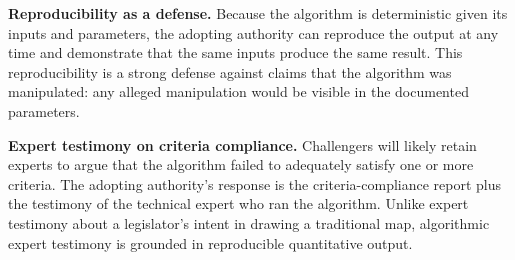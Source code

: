 \textbf{Reproducibility as a defense.}  Because the algorithm is deterministic
given its inputs and parameters, the adopting authority can reproduce the
output at any time and demonstrate that the same inputs produce the same
result.  This reproducibility is a strong defense against claims that the
algorithm was manipulated: any alleged manipulation would be visible in
the documented parameters.

\textbf{Expert testimony on criteria compliance.}  Challengers will likely
retain experts to argue that the algorithm failed to adequately satisfy one
or more criteria.  The adopting authority's response is the criteria-compliance
report plus the testimony of the technical expert who ran the algorithm.
Unlike expert testimony about a legislator's intent in drawing a traditional
map, algorithmic expert testimony is grounded in reproducible quantitative
output.
